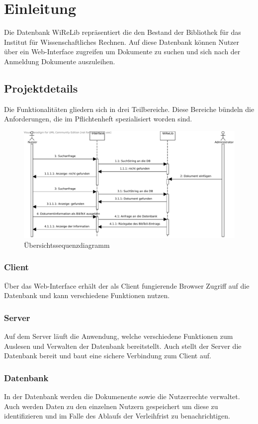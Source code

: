 
\chapter{Einleitung}
Die Datenbank WiReLib repräsentiert die den Bestand der Bibliothek für das Institut für Wissenschaftliches Rechnen.
Auf diese Datenbank können Nutzer über ein Web-Interface zugreifen um Dokumente zu suchen und sich nach der Anmeldung Dokumente auszuleihen.

\section{Projektdetails}
Die Funktionalitäten gliedern sich in drei Teilbereiche.
Diese Bereiche bündeln die Anforderungen, die im Pflichtenheft spezialisiert
worden sind.

\begin{figure}[h]
\includegraphics[width=0.8\linewidth]{bilder/Seq-Uebersicht.pdf}
\caption[Übersichtssequenzdiagramm]{Übersichtssequenzdiagramm}
\label{fig:Seqü}
\end{figure}

\subsection{Client}
Über das Web-Interface erhält der als Client fungierende Browser Zugriff auf die Datenbank und kann verschiedene Funktionen nutzen.

\subsection{Server}
Auf dem Server läuft die Anwendung, welche verschiedene Funktionen zum Auslesen und Verwalten der Datenbank bereitstellt. 
Auch stellt der Server die Datenbank bereit und baut eine sichere Verbindung zum Client auf.

\subsection{Datenbank}
In der Datenbank werden die Dokumenente sowie die Nutzerrechte verwaltet.
Auch werden Daten zu den einzelnen Nutzern gespeichert um diese zu identifizieren und im Falle des Ablaufs der Verleihfrist zu benachrichtigen.
